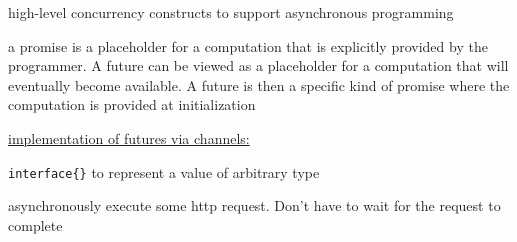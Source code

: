 \documentclass[landscape, a4paper]{article}
\begin{document}
\newpage

\begin{minipage}[t]{0.2\linewidth}
	\begin{betterlist}
		\item high-level concurrency constructs to support asynchronous programming
		\item a \alert{promise} is a placeholder for a computation that is explicitly provided by the programmer. A \alert{future} can be viewed as a placeholder for a computation that will eventually become available. A future is then a \alert{specific kind of promise} where the computation is provided at initialization
		\item \underline{implementation of futures via channels:}
		\begin{betterlist}
			\item \verb|interface{}| to represent a value of arbitrary type
      \item asynchronously execute some http request. Don't have to wait for the request to complete
		\end{betterlist}
\end{betterlist}
\end{minipage}
\end{document}
